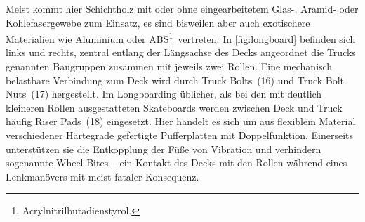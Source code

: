 		Meist kommt hier Schichtholz mit oder ohne eingearbeitetem Glas-, Aramid- oder Kohlefasergewebe zum Einsatz, es sind bisweilen aber auch exotischere Materialien wie Aluminium oder ABS\footnote{\hspace{1mm} Acrylnitrilbutadienstyrol.}~vertreten.
		In \cref{fig:longboard} befinden sich links und rechts, zentral entlang der Längsachse des Decks angeordnet die Trucks genannten Baugruppen zusammen mit jeweils zwei Rollen.
		Eine mechanisch belastbare Verbindung zum Deck wird durch Truck Bolts~(16) und Truck Bolt Nuts~(17) hergestellt.
		Im Longboarding üblicher, als bei den mit deutlich kleineren Rollen ausgestatteten Skateboards werden zwischen Deck und Truck häufig Riser Pads~(18) eingesetzt.
		Hier handelt es sich um aus flexiblem Material verschiedener Härtegrade gefertigte Pufferplatten mit Doppelfunktion.
		Einerseits unterstützen sie die Entkopplung der Füße von Vibration und verhindern sogenannte Wheel Bites -~ein Kontakt des Decks mit den Rollen während eines Lenkmanövers mit meist fataler Konsequenz.

